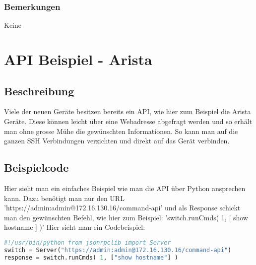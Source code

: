 \documentclass[a4,12pt]{scrartcl}
\begin{document}
\subsubsection{Bemerkungen}
Keine

\section{API Beispiel - Arista}
\subsection{Beschreibung}
Viele der neuen Geräte besitzen bereits ein API, wie hier zum Beispiel die Arista Geräte. Diese können leicht über eine Webadresse abgefragt werden und so erhält man ohne grosse Mühe die gewünschten Informationen. So kann man auf die ganzen SSH Verbindungen verzichten und direkt auf das Gerät verbinden.
\subsection{Beispielcode}
Hier sieht man ein einfaches Beispiel wie man die API über Python ansprechen kann. Dazu benötigt man nur den URL 'https://admin:admin@172.16.130.16/command-api' und als Response schickt man den gewünschten Befehl, wie hier zum Beispiel: 'switch.runCmds( 1, [ \grqq show hostname \grqq ] )'\newline
Hier sieht man ein Codebeispiel:\newline
\begin{lstlisting}[language=python]
#!/usr/bin/python from jsonrpclib import Server
switch = Server("https://admin:admin@172.16.130.16/command-api")
response = switch.runCmds( 1, ["show hostname"] ) 
\end{lstlisting}
\end{document}

